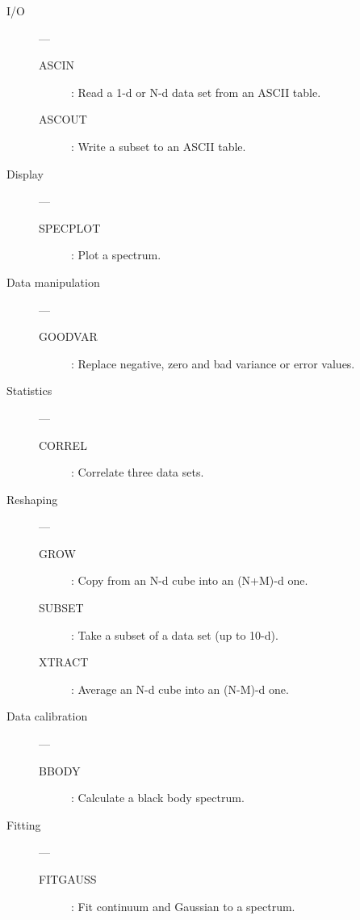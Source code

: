 \begin{description}

\item [I/O] ---
\begin{description}
\item [ASCIN] : Read a 1-d or N-d data set from an ASCII table.
\item [ASCOUT] : Write a subset to an ASCII table.
\end{description}

\item [Display] ---
\begin{description}
\item [SPECPLOT] : Plot a spectrum.
\end{description}

\item [Data manipulation] ---
\begin{description}
\item [GOODVAR] : Replace negative, zero and bad variance or error values.
\end{description}

\item [Statistics] ---
\begin{description}
\item [CORREL] : Correlate three data sets.
\end{description}

\item [Reshaping] ---
\begin{description}
\item [GROW] : Copy from an N-d cube into an (N+M)-d one.
\item [SUBSET] : Take a subset of a data set (up to 10-d).
\item [XTRACT] : Average an N-d cube into an (N-M)-d one.
\end{description}

\item [Data calibration] ---
\begin{description}
\item [BBODY] : Calculate a black body spectrum.
\end{description}

\item [Fitting] ---
\begin{description}
\item [FITGAUSS] : Fit continuum and Gaussian to a spectrum.
\end{description}
\end{description}

